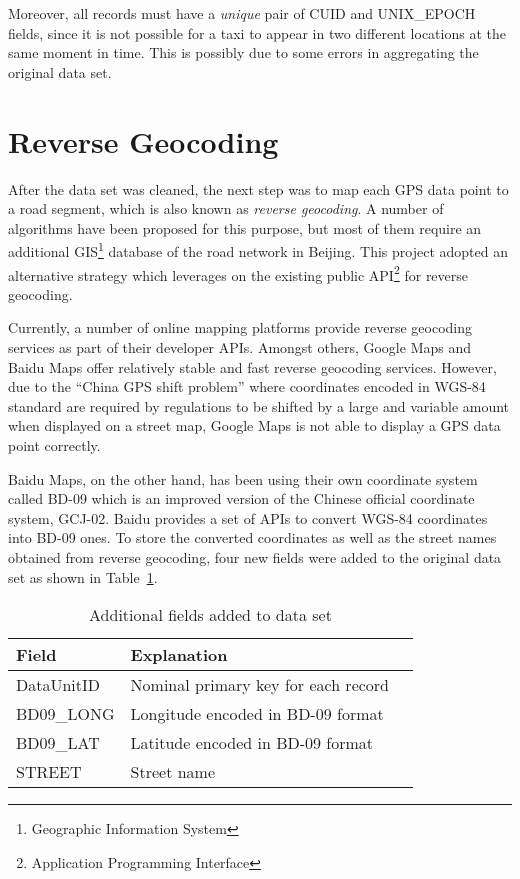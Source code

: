 Moreover, all records must have a \emph{unique} pair of CUID and UNIX\_EPOCH fields, since it is not possible for a taxi to appear in two different locations at the same moment in time. This is possibly due to some errors in aggregating the original data set.

\section{Reverse Geocoding}
After the data set was cleaned, the next step was to map each GPS data point to a road segment, which is also known as \emph{reverse geocoding}. A number of algorithms\cite{MAP09} have been proposed for this purpose, but most of them require an additional GIS\footnote{Geographic Information System} database of the road network in Beijing. This project adopted an alternative strategy which leverages on the existing public API\footnote{Application Programming Interface} for reverse geocoding. 

Currently, a number of online mapping platforms provide reverse geocoding services as part of their developer APIs. Amongst others, Google Maps and Baidu Maps offer relatively stable and fast reverse geocoding services. However, due to the ``China GPS shift problem''\cite{GSHF17} where coordinates encoded in WGS-84 standard are required by regulations to be shifted by a large and variable amount when displayed on a street map, Google Maps is not able to display a GPS data point correctly. 

Baidu Maps, on the other hand, has been using their own coordinate system called BD-09 which is an improved version of the Chinese official coordinate system, GCJ-02. Baidu provides a set of APIs to convert WGS-84 coordinates into BD-09 ones. To store the converted coordinates as well as the street names obtained from reverse geocoding, four new fields were added to the original data set as shown in Table~\ref{Ta:addtional_field}.

\begin{table}
\centering
\begin{tabular}{ | l | l | l | }
\hline
\textbf{Field} & \textbf{Explanation} \\ \hline
DataUnitID & Nominal primary key for each record \\ \hline
BD09\_LONG & Longitude encoded in BD-09 format\\ \hline
BD09\_LAT & Latitude encoded in BD-09 format\\ \hline
STREET & Street name\\ \hline
\end{tabular}
\caption{Additional fields added to data set}\label{Ta:addtional_field}
\end{table}

